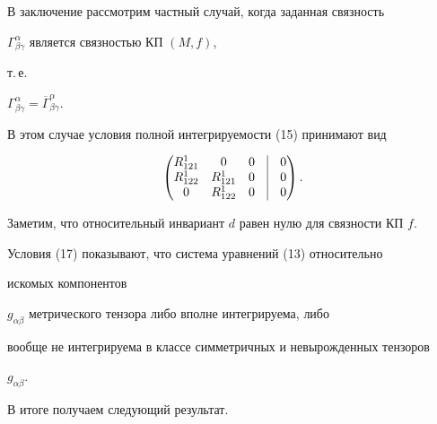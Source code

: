 В заключение рассмотрим частный случай, когда заданная связность


$\Gamma^{\alpha}_{\beta \gamma} $ является связностью КП $(M,f) $,


т.\,е.


$\Gamma^{\alpha}_{\beta \gamma}=\overline{\Gamma}^{\alpha}_{\beta \gamma}$.





В этом случае условия полной интегрируемости (15) принимают вид


\begin{equation}


\begin{pmatrix}


R^1_{121} & 0 & 0 &\vline & 0\\


R^1_{122}& R^1_{121}&0 & \vline & 0 \\


0& R^1_{122}&0 & \vline & 0


\end{pmatrix}


.


\end{equation}


Заметим, что относительный инвариант $d$ равен нулю для связности КП $f$.





Условия (17) показывают, что система уравнений (13) относительно


искомых компонентов


$g_{\alpha \beta} $ метрического тензора либо вполне интегрируема, либо


вообще не интегрируема в классе симметричных и невырожденных тензоров


$g_{\alpha \beta}$.





В итоге получаем следующий результат.





